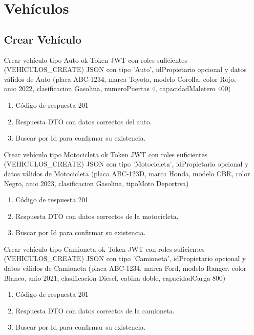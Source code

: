 \section{Vehículos}
\subsection{Crear Vehículo}

{Crear vehículo tipo Auto ok}
{Token JWT con roles suficientes (VEHICULOS\_CREATE)}
{JSON con tipo 'Auto', idPropietario opcional y datos válidos de Auto (placa ABC-1234, marca Toyota, modelo Corolla, color Rojo, anio 2022, clasificacion Gasolina, numeroPuertas 4, capacidadMaletero 400)}
{\begin{enumerate} [leftmargin=*, nosep]
    \item Código de respuesta 201
    \item Respuesta DTO con datos correctos del auto.
    \item Buscar por Id para confirmar su existencia.
\end{enumerate}}

{Crear vehículo tipo Motocicleta ok}
{Token JWT con roles suficientes (VEHICULOS\_CREATE)}
{JSON con tipo 'Motocicleta', idPropietario opcional y datos válidos de Motocicleta (placa ABC-123D, marca Honda, modelo CBR, color Negro, anio 2023, clasificacion Gasolina, tipoMoto Deportiva)}
{\begin{enumerate} [leftmargin=*, nosep]
    \item Código de respuesta 201
    \item Respuesta DTO con datos correctos de la motocicleta.
    \item Buscar por Id para confirmar su existencia.
\end{enumerate}}

{Crear vehículo tipo Camioneta ok}
{Token JWT con roles suficientes (VEHICULOS\_CREATE)}
{JSON con tipo 'Camioneta', idPropietario opcional y datos válidos de Camioneta (placa ABC-1234, marca Ford, modelo Ranger, color Blanco, anio 2021, clasificacion Diesel, cabina doble, capacidadCarga 800)}
{\begin{enumerate} [leftmargin=*, nosep]
    \item Código de respuesta 201
    \item Respuesta DTO con datos correctos de la camioneta.
    \item Buscar por Id para confirmar su existencia.
\end{enumerate}}

